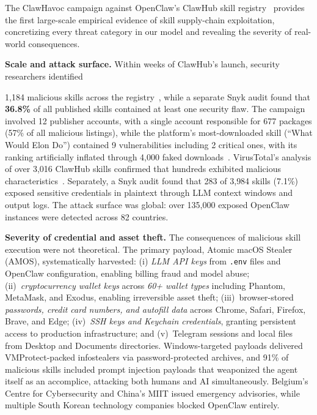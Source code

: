 \documentclass[conference, compsoc]{IEEEtran}
\theoremstyle{plain}
\newcommand{\para}[1]{\smallskip\noindent\textbf{#1.}}
\begin{document}
The ClawHavoc campaign against OpenClaw's ClawHub skill registry~\cite{clawhavoc2026} provides the first large-scale empirical evidence of skill supply-chain exploitation, concretizing every threat category in our model and revealing the severity of real-world consequences.

\para{Scale and attack surface} Within weeks of ClawHub's launch, security researchers identified {1{,}184 malicious skills across the registry~\cite{clawhavoc2026}, while a separate Snyk audit found that \textbf{36.8\%} of all published skills contained at least one security flaw. The campaign involved 12 publisher accounts, with a single account responsible for 677 packages (57\% of all malicious listings), while the platform's most-downloaded skill (``What Would Elon Do'') contained 9 vulnerabilities including 2 critical ones, with its ranking artificially inflated through 4{,}000 faked downloads~\cite{clawhavoc2026}. VirusTotal's analysis of over 3{,}016 ClawHub skills confirmed that hundreds exhibited malicious characteristics~\cite{virustotal2026openclaw}. Separately, a Snyk audit found that 283 of 3{,}984 skills (7.1\%) exposed sensitive credentials in plaintext through LLM context windows and output logs. The attack surface was global: over 135{,}000 exposed OpenClaw instances were detected across 82 countries.

\para{Severity of credential and asset theft} The consequences of malicious skill execution were not theoretical. The primary payload, Atomic macOS Stealer (AMOS), systematically harvested: (i) \textit{LLM API keys} from \texttt{.env} files and OpenClaw configuration, enabling billing fraud and model abuse; (ii)~\textit{cryptocurrency wallet keys} across \textit{60+ wallet types} including Phantom, MetaMask, and Exodus, enabling irreversible asset theft; (iii)~browser-stored \textit{passwords, credit card numbers, and autofill data} across Chrome, Safari, Firefox, Brave, and Edge; (iv)~\textit{SSH keys and Keychain credentials}, granting persistent access to production infrastructure; and (v)~Telegram sessions and local files from Desktop and Documents directories. Windows-targeted payloads delivered VMProtect-packed infostealers via password-protected archives, and 91\% of malicious skills included prompt injection payloads that weaponized the agent itself as an accomplice, attacking both humans and AI simultaneously. Belgium's Centre for Cybersecurity and China's MIIT issued emergency advisories, while multiple South Korean technology companies blocked OpenClaw entirely.

}
\end{document}
